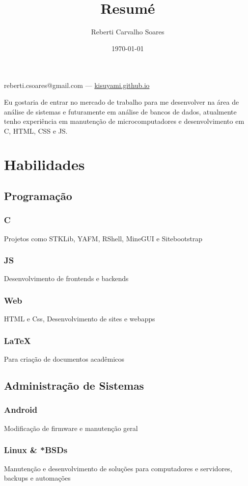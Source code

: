 \documentclass[11pt]{article}
\author{Reberti Carvalho Soares}
\date{\today}
\title{Resumé}
\begin{document}
\begin{center}
  {\huge\bfseries
    \theauthor}

    \vspace{.25em}
    reberti.csoares@gmail.com --- \url{kisuyami.github.io}

\end{center}

Eu gostaria de entrar no mercado de trabalho para me desenvolver na área
de análise de sistemas e futuramente em análise de bancos de dados,
atualmente tenho experiência em manutenção de microcomputadores e
desenvolvimento em C, HTML, CSS e JS.

\section{Habilidades}
\label{sec:org7176000}
\subsection{Programação}
\label{sec:orgc403d23}
\subsubsection{C}
\label{sec:org9d1067e}
Projetos como STKLib, YAFM, RShell, MineGUI e Sitebootstrap
\subsubsection{JS}
\label{sec:orgaeaa69a}
Desenvolvimento de frontends e backends
\subsubsection{Web}
\label{sec:org0fc94b5}
HTML e Css, Desenvolvimento de sites e webapps
\subsubsection{\LaTeX{}}
\label{sec:org964d320}
Para criação de documentos acadêmicos

\subsection{Administração de Sistemas}
\label{sec:org85e879b}
\subsubsection{Android}
\label{sec:org1eb1a8e}
Modificação de firmware e manutenção geral
\subsubsection{Linux \& *BSDs}
\label{sec:orgf1e7af1}
Manutenção e desenvolvimento de soluções para computadores e servidores, backups e automações
\end{document}
